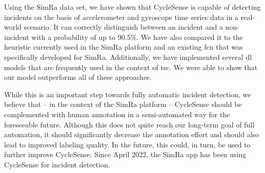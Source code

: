 Using the SimRa data set, we have shown that CycleSense is capable of detecting incidents on the basis of accelerometer and gyroscope time series data in a real-world scenario.
It can correctly distinguish between an incident and a non-incident with a probability of up to 90.5\%.
We have also compared it to the heuristic currently used in the SimRa platform and an existing \ac{fcn} that was specifically developed for SimRa.
Additionally, we have implemented several \ac{dl} models that are frequently used in the context of \ac{tsc}.
We were able to show that our model outperforms all of these approaches.

While this is an important step towards fully automatic incident detection, we believe that -- in the context of the SimRa platform -- CycleSense should be complemented with human annotation in a semi-automated way for the foreseeable future.
Although this does not quite reach our long-term goal of full automation, it should significantly decrease the annotation effort and should also lead to improved labeling quality.
In the future, this could, in turn, be used to further improve CycleSense.
Since April 2022, the SimRa app has been using CycleSense for incident detection.
